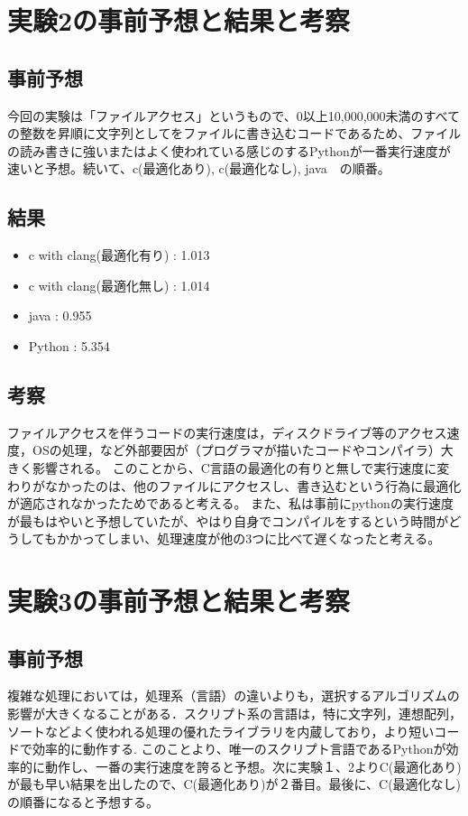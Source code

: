 \documentclass[a4paper, 11pt, titlepage]{jsarticle}
\begin{document}
\section{実験2の事前予想と結果と考察}
\subsection{事前予想}
今回の実験は「ファイルアクセス」というもので、0以上10,000,000未満のすべての整数を昇順に文字列としてをファイルに書き込むコードであるため、ファイルの読み書きに強いまたはよく使われている感じのするPythonが一番実行速度が速いと予想。続いて、c(最適化あり), c(最適化なし),  java　の順番。

\subsection{結果}
\begin{itemize}
\item c with clang(最適化有り) : 1.013
\item c with clang(最適化無し) : 1.014
\item java : 0.955
\item Python : 5.354
\end{itemize}
\subsection{考察}
ファイルアクセスを伴うコードの実行速度は，ディスクドライブ等のアクセス速度，OSの処理，など外部要因が（プログラマが描いたコードやコンパイラ）大きく影響される。
このことから、C言語の最適化の有りと無しで実行速度に変わりがなかったのは、他のファイルにアクセスし、書き込むという行為に最適化が適応されなかったためであると考える。
また、私は事前にpythonの実行速度が最もはやいと予想していたが、やはり自身でコンパイルをするという時間がどうしてもかかってしまい、処理速度が他の3つに比べて遅くなったと考える。

\section{実験3の事前予想と結果と考察}
\subsection{事前予想}
複雑な処理においては，処理系（言語）の違いよりも，選択するアルゴリズムの影響が大きくなることがある．スクリプト系の言語は，特に文字列，連想配列，ソートなどよく使われる処理の優れたライブラリを内蔵しており，より短いコードで効率的に動作する.
このことより、唯一のスクリプト言語であるPythonが効率的に動作し、一番の実行速度を誇ると予想。次に実験１、2よりC(最適化あり)が最も早い結果を出したので、C(最適化あり)が２番目。最後に、C(最適化なし)の順番になると予想する。
\end{document}
